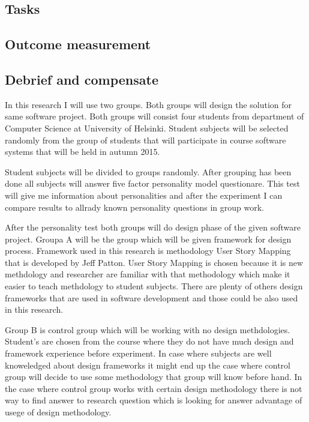\documentclass[english]{tktltiki2}
\theoremstyle{definition}
\theoremstyle{remark}
\begin{document}
\subsection{Tasks}

\subsection{Outcome measurement}

\subsection{Debrief and compensate}

In this research I will use two groups. Both groups will design the solution for same software project. Both groups will consist four students from department of Computer Science at University of Helsinki. Student subjects will be selected randomly from the group of students that will participate in course software systems that will be held in autumn 2015.

Student subjects will be divided to groups randomly. After grouping has been done all subjects will answer five factor personality model questionare\cite{fiveFactor}. This test will give me information about personalities and after the experiment I can compare results to allrady known personality questions in group work.

After the personality test both groups will do design phase of the given software project. Groupa A will be the group which will be given framework for design process. Framework used in this research is methodology User Story Mapping that is developed by Jeff Patton\cite{userStoryMapping}. User Story Mapping is chosen because it is new methdology and researcher are familiar with that methodology which make it easier to teach methdology to student subjects. There are plenty of others design frameworks that are used in software development and those could be also used in this research.

Group B is control group which will be working with no design methdologies. Student's are chosen from the course where they do not have much design and framework experience before experiment. In case where subjects are well knoweledged about design frameworks it might end up the case where control group will decide to use some methodology that group will know before hand. In the case where control group works with certain design methodology there is not way to find answer to research question which is looking for answer advantage of usege of design methodology.
\end{document}
